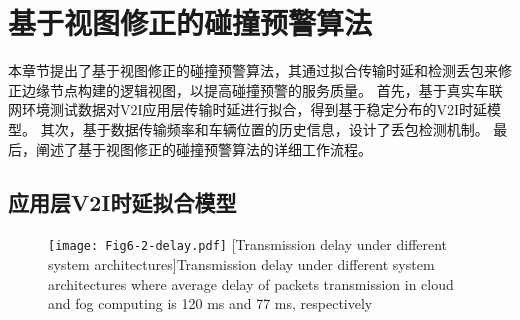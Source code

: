 \section{基于视图修正的碰撞预警算法}\label{section 5-3}

本章节提出了基于视图修正的碰撞预警算法，其通过拟合传输时延和检测丢包来修正边缘节点构建的逻辑视图，以提高碰撞预警的服务质量。
首先，基于真实车联网环境测试数据对V2I应用层传输时延进行拟合，得到基于稳定分布的V2I时延模型。
其次，基于数据传输频率和车辆位置的历史信息，设计了丢包检测机制。
最后，阐述了基于视图修正的碰撞预警算法的详细工作流程。

\subsection{应用层V2I时延拟合模型}

\begin{figure}[h]
\centering
  \texttt{[image: Fig6-2-delay.pdf]}
  [Transmission delay under different system architectures]{Transmission delay under different system architectures where average delay of packets transmission in cloud and fog computing is 120 ms and 77 ms, respectively}
  \label{fig 5-2}
\end{figure}

